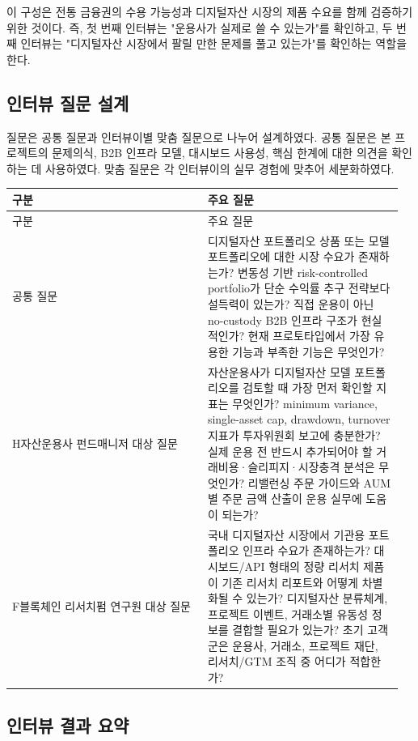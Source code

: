 \documentclass[12pt,a4paper]{article}
\begin{document}
이 구성은 전통 금융권의 수용 가능성과 디지털자산 시장의 제품 수요를 함께 검증하기 위한 것이다. 즉, 첫 번째 인터뷰는 "운용사가 실제로 쓸 수 있는가"를 확인하고, 두 번째 인터뷰는 "디지털자산 시장에서 팔릴 만한 문제를 풀고 있는가"를 확인하는 역할을 한다.

\subsection{인터뷰 질문 설계}

질문은 공통 질문과 인터뷰이별 맞춤 질문으로 나누어 설계하였다. 공통 질문은 본 프로젝트의 문제의식, B2B 인프라 모델, 대시보드 사용성, 핵심 한계에 대한 의견을 확인하는 데 사용하였다. 맞춤 질문은 각 인터뷰이의 실무 경험에 맞추어 세분화하였다.

\begin{center}
\small
\begin{longtable}{@{}p{0.48\linewidth}p{0.48\linewidth}@{}}
\toprule
구분 & 주요 질문 \\
\midrule
\endfirsthead
\toprule
구분 & 주요 질문 \\
\midrule
\endhead
공통 질문 & 디지털자산 포트폴리오 상품 또는 모델 포트폴리오에 대한 시장 수요가 존재하는가? 변동성 기반 risk-controlled portfolio가 단순 수익률 추구 전략보다 설득력이 있는가? 직접 운용이 아닌 no-custody B2B 인프라 구조가 현실적인가? 현재 프로토타입에서 가장 유용한 기능과 부족한 기능은 무엇인가? \\
H자산운용사 펀드매니저 대상 질문 & 자산운용사가 디지털자산 모델 포트폴리오를 검토할 때 가장 먼저 확인할 지표는 무엇인가? minimum variance, single-asset cap, drawdown, turnover 지표가 투자위원회 보고에 충분한가? 실제 운용 전 반드시 추가되어야 할 거래비용·슬리피지·시장충격 분석은 무엇인가? 리밸런싱 주문 가이드와 AUM별 주문 금액 산출이 운용 실무에 도움이 되는가? \\
F블록체인 리서치펌 연구원 대상 질문 & 국내 디지털자산 시장에서 기관용 포트폴리오 인프라 수요가 존재하는가? 대시보드/API 형태의 정량 리서치 제품이 기존 리서치 리포트와 어떻게 차별화될 수 있는가? 디지털자산 분류체계, 프로젝트 이벤트, 거래소별 유동성 정보를 결합할 필요가 있는가? 초기 고객군은 운용사, 거래소, 프로젝트 재단, 리서치/GTM 조직 중 어디가 적합한가? \\
\bottomrule
\end{longtable}
\end{center}


\subsection{인터뷰 결과 요약}
\end{document}
